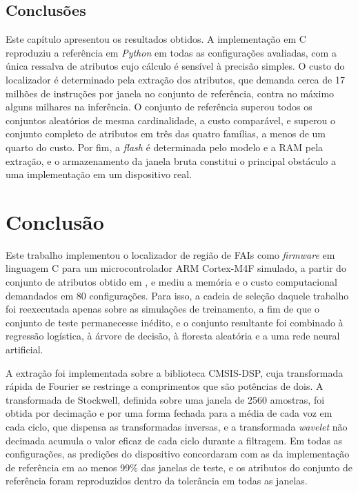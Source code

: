 \documentclass[
	12pt,				%
	openright,			%
	oneside,			%
	a4paper,			%
	english,			%
	brazil,				%
	]{abntex2}
\begin{document}
\section{Conclusões}
Este capítulo apresentou os resultados obtidos. A implementação em C reproduziu a referência em \textit{Python} em todas as configurações avaliadas, com a única ressalva de atributos cujo cálculo é sensível à precisão simples. O custo do localizador é determinado pela extração dos atributos, que demanda cerca de 17 milhões de instruções por janela no conjunto de referência, contra no máximo alguns milhares na inferência. O conjunto de referência superou todos os conjuntos aleatórios de mesma cardinalidade, a custo comparável, e superou o conjunto completo de atributos em três das quatro famílias, a menos de um quarto do custo. Por fim, a \textit{flash} é determinada pelo modelo e a RAM pela extração, e o armazenamento da janela bruta constitui o principal obstáculo a uma implementação em um dispositivo real.

\chapter{Conclusão}

Este trabalho implementou o localizador de região de FAIs como \textit{firmware} em linguagem C para um microcontrolador ARM Cortex-M4F simulado, a partir do conjunto de atributos obtido em , e mediu a memória e o custo computacional demandados em 80 configurações. Para isso, a cadeia de seleção daquele trabalho foi reexecutada apenas sobre as simulações de treinamento, a fim de que o conjunto de teste permanecesse inédito, e o conjunto resultante foi combinado à regressão logística, à árvore de decisão, à floresta aleatória e a uma rede neural artificial.

A extração foi implementada sobre a biblioteca CMSIS-DSP, cuja transformada rápida de Fourier se restringe a comprimentos que são potências de dois. A transformada de Stockwell, definida sobre uma janela de 2560 amostras, foi obtida por decimação e por uma forma fechada para a média de cada voz em cada ciclo, que dispensa as transformadas inversas, e a transformada \textit{wavelet} não decimada acumula o valor eficaz de cada ciclo durante a filtragem. Em todas as configurações, as predições do dispositivo concordaram com as da implementação de referência em ao menos 99\% das janelas de teste, e os atributos do conjunto de referência foram reproduzidos dentro da tolerância em todas as janelas.
\end{document}
